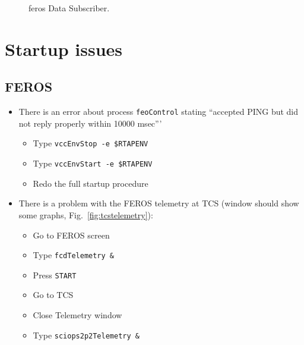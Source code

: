 \documentclass[11pt,fleqn]{book} %
\newcounter{procedure}[chapter]
\begin{document}
\begin{figure}[t!]
\begin{minipage}{0.48\linewidth}
\end{minipage}
\hspace{0.02\linewidth}
\begin{minipage}{0.48\linewidth}
\end{minipage}
\caption{\gls{feros} Data Subscriber.}
\end{figure}

\newpage
\section{Startup issues}

\subsection{FEROS}
\label{sec:ferosstartuptimeout}
\begin{itemize}
  \item There is an error about process \texttt{feoControl} stating
      ``accepted PING but did not reply properly within 10000 msec'''
      \begin{itemize}
        \item Type \texttt{vccEnvStop -e \$RTAPENV}
        \item Type \texttt{vccEnvStart -e \$RTAPENV}
        \item Redo the full startup procedure
      \end{itemize}
 \item There is a problem with the FEROS telemetry at TCS (window should show some graphs, Fig.~\ref{fig:tcstelemetry}):
      \begin{itemize}
        \item Go to FEROS screen
        \item Type \texttt{fcdTelemetry \&}
        \item Press \texttt{START}
        \item Go to TCS
        \item Close Telemetry window
        \item Type \texttt{sciops2p2Telemetry \&}
      \end{itemize}
\end{itemize}
\end{document}
